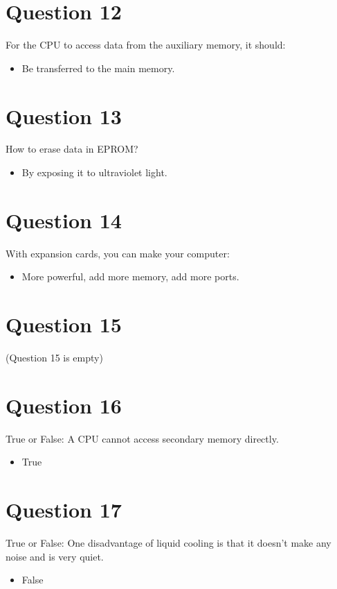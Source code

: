 \documentclass{article}
\begin{document}
\section*{Question 12}
For the CPU to access data from the auxiliary memory, it should:
\begin{itemize}[label=\alph*.]
    \item Be transferred to the main memory.
\end{itemize}

\section*{Question 13}
How to erase data in EPROM?
\begin{itemize}[label=\alph*.]
    \item By exposing it to ultraviolet light.
\end{itemize}

\section*{Question 14}
With expansion cards, you can make your computer:
\begin{itemize}[label=\alph*.]
    \item More powerful, add more memory, add more ports.
\end{itemize}

\section*{Question 15}
(Question 15 is empty)

\section*{Question 16}
True or False: A CPU cannot access secondary memory directly.
\begin{itemize}[label=\alph*.]
    \item True
\end{itemize}

\section*{Question 17}
True or False: One disadvantage of liquid cooling is that it doesn't make any noise and is very quiet.
\begin{itemize}[label=\alph*.]
    \item False
\end{itemize}
\end{document}
